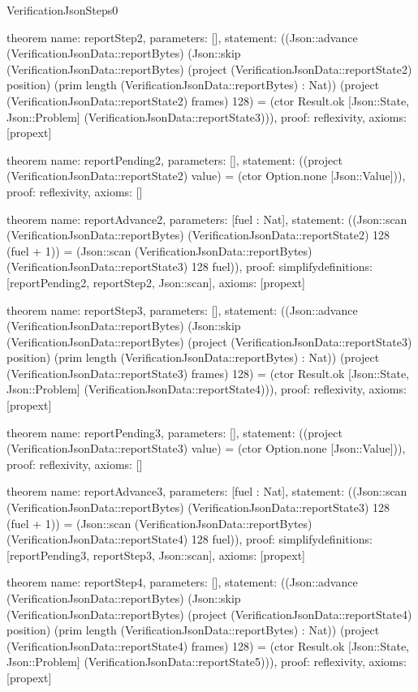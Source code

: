 \begin{lexlean}{VerificationJsonSteps0}
\begin{semanticmodule}
theorem{
  name: reportStep2,
  parameters: [],
  statement: ((Json::advance (VerificationJsonData::reportBytes) (Json::skip (VerificationJsonData::reportBytes) (project (VerificationJsonData::reportState2) position) (prim length (VerificationJsonData::reportBytes) : Nat)) (project (VerificationJsonData::reportState2) frames) 128) = (ctor Result.ok [Json::State, Json::Problem] (VerificationJsonData::reportState3))),
  proof: reflexivity{},
  axioms: [propext]
}

theorem{
  name: reportPending2,
  parameters: [],
  statement: ((project (VerificationJsonData::reportState2) value) = (ctor Option.none [Json::Value])),
  proof: reflexivity{},
  axioms: []
}

theorem{
  name: reportAdvance2,
  parameters: [fuel : Nat],
  statement: ((Json::scan (VerificationJsonData::reportBytes) (VerificationJsonData::reportState2) 128 (fuel + 1)) = (Json::scan (VerificationJsonData::reportBytes) (VerificationJsonData::reportState3) 128 fuel)),
  proof: simplify{definitions: [reportPending2, reportStep2, Json::scan]},
  axioms: [propext]
}

theorem{
  name: reportStep3,
  parameters: [],
  statement: ((Json::advance (VerificationJsonData::reportBytes) (Json::skip (VerificationJsonData::reportBytes) (project (VerificationJsonData::reportState3) position) (prim length (VerificationJsonData::reportBytes) : Nat)) (project (VerificationJsonData::reportState3) frames) 128) = (ctor Result.ok [Json::State, Json::Problem] (VerificationJsonData::reportState4))),
  proof: reflexivity{},
  axioms: [propext]
}

theorem{
  name: reportPending3,
  parameters: [],
  statement: ((project (VerificationJsonData::reportState3) value) = (ctor Option.none [Json::Value])),
  proof: reflexivity{},
  axioms: []
}

theorem{
  name: reportAdvance3,
  parameters: [fuel : Nat],
  statement: ((Json::scan (VerificationJsonData::reportBytes) (VerificationJsonData::reportState3) 128 (fuel + 1)) = (Json::scan (VerificationJsonData::reportBytes) (VerificationJsonData::reportState4) 128 fuel)),
  proof: simplify{definitions: [reportPending3, reportStep3, Json::scan]},
  axioms: [propext]
}

theorem{
  name: reportStep4,
  parameters: [],
  statement: ((Json::advance (VerificationJsonData::reportBytes) (Json::skip (VerificationJsonData::reportBytes) (project (VerificationJsonData::reportState4) position) (prim length (VerificationJsonData::reportBytes) : Nat)) (project (VerificationJsonData::reportState4) frames) 128) = (ctor Result.ok [Json::State, Json::Problem] (VerificationJsonData::reportState5))),
  proof: reflexivity{},
  axioms: [propext]
}


\end{semanticmodule}
\end{lexlean}
